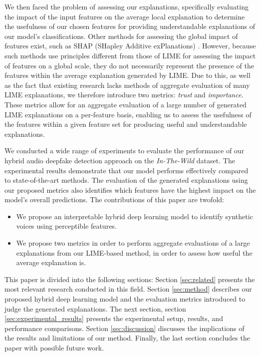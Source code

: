 \documentclass{article}
\begin{document}
We then faced the problem of assessing our explanations, specifically evaluating the impact of the input features on the average local explanation to determine the usefulness of our chosen features for providing understandable explanations of our model's classifications. Other methods for assessing the global impact of features exist, such as SHAP (SHapley Additive exPlanations) \cite{lundberg2017unified}. However, because such methods use principles different from those of LIME for assessing the impact of features on a global scale, they do not necessarily represent the presence of the features within the average explanation generated by LIME. Due to this, as well as the fact that existing research lacks methods of aggregate evaluation of many LIME explanations, we therefore introduce two metrics: \textit{trust} and \textit{importance}. These metrics allow for an aggregate evaluation of a large number of generated LIME explanations on a per-feature basis, enabling us to assess the usefulness of the features within a given feature set for producing useful and understandable explanations.


We conducted a wide range of experiments to evaluate the performance of our hybrid audio deepfake detection approach on the \textit{In-The-Wild} dataset. The experimental results demonstrate that our model performs effectively compared to state-of-the-art methods. The evaluation of the generated explanations using our proposed metrics also identifies which features have the highest impact on the model's overall predictions. The contributions of this paper are twofold:
\begin{itemize}
\item We propose an interpretable hybrid deep learning model to identify synthetic voices using perceptible features.
\item We propose two metrics in order to perform aggregate evaluations of a large explanations from our LIME-based method, in order to assess how useful the average explanation is.
\end{itemize}

This paper is divided into the following sections: Section \ref{sec:related} presents the most relevant research conducted in this field. Section \ref{sec:method} describes our proposed hybrid deep learning model and the evaluation metrics introduced to judge the generated explanations. The next section, section \ref{sec:experimental_results} presents the experimental setup, results, and performance comparisons. Section \ref{sec:discussion} discusses the implications of the results and limitations of our method. Finally, the last section concludes the paper with possible future work.
\end{document}
